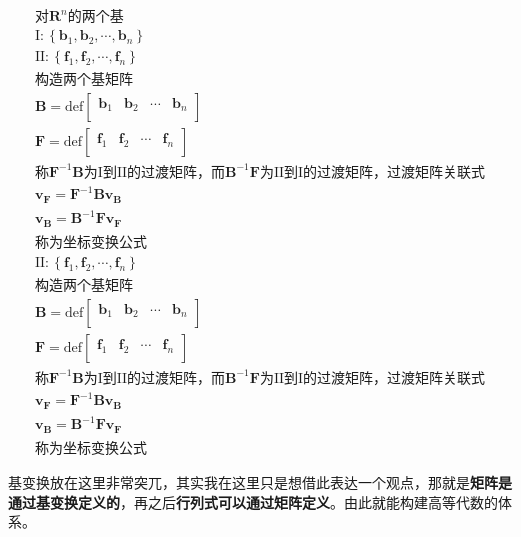 \documentclass[12pt,hyperref,a4paper,UTF8]{ctexart}
\begin{document}
\begin{gather*}
\text{对}\mathbf{R}^n\text{的两个基}\\
\mathrm{I} : \left\{ \bm{b}_1,\bm{b}_2,\cdots ,\bm{b}_n \right\} \\
\mathrm{II} : \left\{ \bm{f}_1,\bm{f}_2,\cdots ,\bm{f}_n \right\} \\
\text{构造两个基矩阵}\\
\bm{B}={\mathrm{def}}\left[ 
\begin{matrix}
	\bm{b}_1&		\bm{b}_2&		\cdots&		\bm{b}_n\\
\end{matrix} \right] \\
\bm{F}={\mathrm{def}}\left[ \begin{matrix}
	\bm{f}_1&		\bm{f}_2&		\cdots&		\bm{f}_n\\
\end{matrix} \right] \\
\text{称}\bm{F}^{-1}\bm{B}\text{为} \mathrm{I} \text{到} \mathrm{II} \text{的过渡矩阵，而}\bm{B}^{-1}\bm{F}\text{为} \mathrm{II} \text{到} \mathrm{I} \text{的过渡矩阵，过渡矩阵关联式}\\
\bm{v}_{\bm{F}}=\bm{F}^{-1}\bm{Bv}_{\bm{B}}\\
\bm{v}_{\bm{B}}=\bm{B}^{-1}\bm{Fv}_{\bm{F}}\\
\text{称为坐标变换公式}\\
\mathrm{II}:\left\{ \bm{f}_1,\bm{f}_2,\cdots ,\bm{f}_n \right\} \\
\text{构造两个基矩阵}\\
\bm{B}={\mathrm{def}}\left[ \begin{matrix}
	\bm{b}_1&		\bm{b}_2&		\cdots&		\bm{b}_n\\
\end{matrix} \right] \\
\bm{F}={\mathrm{def}}\left[ \begin{matrix}
	\bm{f}_1&		\bm{f}_2&		\cdots&		\bm{f}_n\\
\end{matrix} \right] \\
\text{称}\bm{F}^{-1}\bm{B}\text{为I到II的过渡矩阵，而}\bm{B}^{-1}\bm{F}\text{为II到I的过渡矩阵，过渡矩阵关联式}\\
\bm{v}_{\bm{F}}=\bm{F}^{-1}\bm{Bv}_{\bm{B}}\\
\bm{v}_{\bm{B}}=\bm{B}^{-1}\bm{Fv}_{\bm{F}}\\
\text{称为坐标变换公式}
\end{gather*}

基变换放在这里非常突兀，其实我在这里只是想借此表达一个观点，那就是\textbf{矩阵是通过基变换定义的}，再之后\textbf{行列式可以通过矩阵定义}。由此就能构建高等代数的体系。
\end{document}
